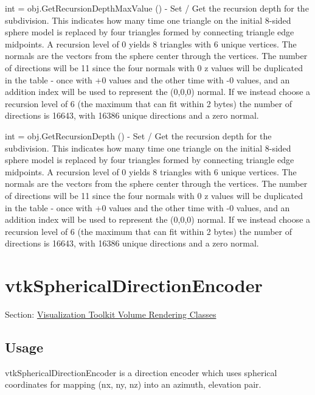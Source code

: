 \begin{DoxyItemize}
\item {\ttfamily int = obj.\-Get\-Recursion\-Depth\-Max\-Value ()} -\/ Set / Get the recursion depth for the subdivision. This indicates how many time one triangle on the initial 8-\/sided sphere model is replaced by four triangles formed by connecting triangle edge midpoints. A recursion level of 0 yields 8 triangles with 6 unique vertices. The normals are the vectors from the sphere center through the vertices. The number of directions will be 11 since the four normals with 0 z values will be duplicated in the table -\/ once with +0 values and the other time with -\/0 values, and an addition index will be used to represent the (0,0,0) normal. If we instead choose a recursion level of 6 (the maximum that can fit within 2 bytes) the number of directions is 16643, with 16386 unique directions and a zero normal.  
\item {\ttfamily int = obj.\-Get\-Recursion\-Depth ()} -\/ Set / Get the recursion depth for the subdivision. This indicates how many time one triangle on the initial 8-\/sided sphere model is replaced by four triangles formed by connecting triangle edge midpoints. A recursion level of 0 yields 8 triangles with 6 unique vertices. The normals are the vectors from the sphere center through the vertices. The number of directions will be 11 since the four normals with 0 z values will be duplicated in the table -\/ once with +0 values and the other time with -\/0 values, and an addition index will be used to represent the (0,0,0) normal. If we instead choose a recursion level of 6 (the maximum that can fit within 2 bytes) the number of directions is 16643, with 16386 unique directions and a zero normal.  
\end{DoxyItemize}\hypertarget{vtkvolumerendering_vtksphericaldirectionencoder}{}\section{vtk\-Spherical\-Direction\-Encoder}\label{vtkvolumerendering_vtksphericaldirectionencoder}
Section\-: \hyperlink{sec_vtkvolumerendering}{Visualization Toolkit Volume Rendering Classes} \hypertarget{vtkwidgets_vtkxyplotwidget_Usage}{}\subsection{Usage}\label{vtkwidgets_vtkxyplotwidget_Usage}
vtk\-Spherical\-Direction\-Encoder is a direction encoder which uses spherical coordinates for mapping (nx, ny, nz) into an azimuth, elevation pair.

